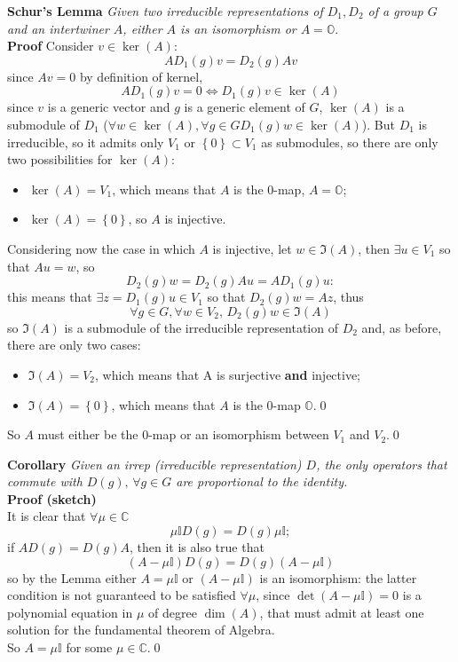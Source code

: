 \textbf{Schur's Lemma} \textit{Given two irreducible representations of
$D_1,D_2$ of a group $G$ and an intertwiner $A$, either $A$ is an isomorphism
or $A=\mathbb{O}$}.\\
\textbf{Proof} Consider $v\in\ker(A)$:
$$AD_1(g)v = D_2(g)Av$$
since $Av=0$ by definition of kernel,
$$AD_1(g)v=0 \iff D_1(g)v\in\ker(A)$$
since $v$ is a generic vector and $g$ is a generic element of $G$, $\ker(A)$ is
a submodule of $D_1$ ($\forall w\in
\ker(A),\forall g\in G D_1(g)w \in\ker(A)$). But $D_1$ is irreducible, so it
admits only $V_1$ or $\left\{0\right\}\subset V_1$ as submodules, so there are
only two possibilities for $\ker(A)$:
\begin{itemize}
    \item $\ker(A) = V_1$, which means that $A$ is the 0-map, $A=\mathbb{O}$;
    \item $\ker(A) = \left\{0\right\}$, so $A$ is injective.
\end{itemize}
Considering now the case in which $A$ is injective, let $w\in\Im(A)$, then
$\exists u\in V_1$ so that $Au=w$, so
$$D_2(g)w = D_2(g)Au=AD_1(g)u:$$
this means that $\exists z =D_1(g)u\in V_1$ so that $D_2(g)w = Az$, thus
$$\forall g\in G,\forall w\in V_2,\, D_2(g)w\in\Im(A)$$
so $\Im(A)$ is a submodule of the irreducible representation of $D_2$ and,
as before, there are only two cases:
\begin{itemize}
    \item $\Im(A)=V_2$, which means that A is surjective \textbf{and} injective;
    \item $\Im(A)=\left\{0\right\}$, which means that $A$ is the 0-map
        $\mathbb{O}$.\qed
\end{itemize}
So $A$ must either be the $0$-map or an isomorphism between $V_1$ and $V_2$.\qed

\textbf{Corollary} \textit{Given an irrep (irreducible representation) $D$, the
only operators that commute with $D(g),\,\forall g\in G$ are proportional
to the identity.}\\
\textbf{Proof (sketch)}\\
It is clear that $\forall\mu\in\mathbb{C}$
$$\mu\mathbb{I}D(g) = D(g)\mu\mathbb{I};$$
if $AD(g)=D(g)A$, then it is also true that
$$(A-\mu\mathbb{I})D(g) = D(g)(A-\mu\mathbb{I})$$
so by the Lemma either $A=\mu\mathbb{I}$ or $(A-\mu\mathbb{I})$ is an isomorphism:
the latter condition is not guaranteed to be satisfied $\forall\mu$, since
$\det(A-\mu\mathbb{I})=0$ is a polynomial equation in $\mu$ of degree
$\dim(A)$, that must admit at least one solution for the fundamental theorem of
Algebra.\\
So $A=\mu\mathbb{I}$ for some $\mu\in\mathbb{C}$.\qed

